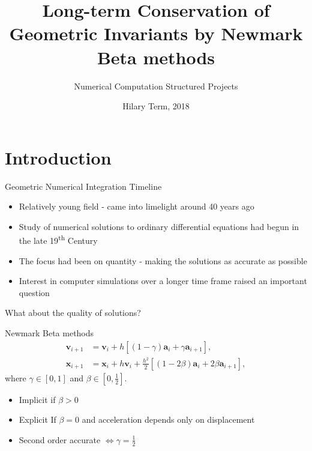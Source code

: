 \documentclass{beamer}
\title{Long-term Conservation of Geometric Invariants by Newmark Beta methods}
\subtitle{Numerical Computation Structured Projects}
\date{Hilary Term, 2018}
\renewcommand{\vec}[1]{\mathbf{#1}}
\begin{document}
{
\begin{frame}[noframenumbering]
	\titlepage
\end{frame}
}

\section{Introduction}
\begin{frame}{Geometric Numerical Integration Timeline}
	\begin{itemize}
		\item<1->
			Relatively young field - came into limelight around 40 years ago
		\item<1->
			Study of numerical solutions to ordinary differential equations had begun in the late 19\textsuperscript{th} Century
		\item<1->
			The focus had been on quantity - making the solutions as accurate as possible
		\item<1->
			Interest in computer simulations over a longer time frame raised an important question
	\end{itemize}
	 {\centering \alert{What about the quality of solutions?}}
\end{frame}

\begin{frame}[t]{Newmark Beta methods}
\begin{align*}
		\vec{v}_{i+1} & = \vec{v}_{i} + h\left[\left(1-\gamma \right)\vec{a}_{i} + \gamma \vec{a}_{i+1}\right], \\
		\vec{x}_{i+1} & = \vec{x}_{i} + h\vec{v}_{i} + \frac{h^2}{2}\left[ \left(1-2\beta \right)\vec{a}_{i} + 2\beta \vec{a}_{i+1}\right] ,
\end{align*} where $\gamma \in \left[0, 1 \right]$ and $\beta \in \left[0, \frac{1}{2} \right]$.
\bigskip
\begin{itemize}
	\item
	Implicit if $\beta > 0$
	\item
	Explicit If $\beta = 0$ and acceleration depends only on displacement
	\item 
	Second order accurate $\Leftrightarrow \gamma = \frac{1}{2}$
\end{itemize}
\end{frame}
\end{document}
